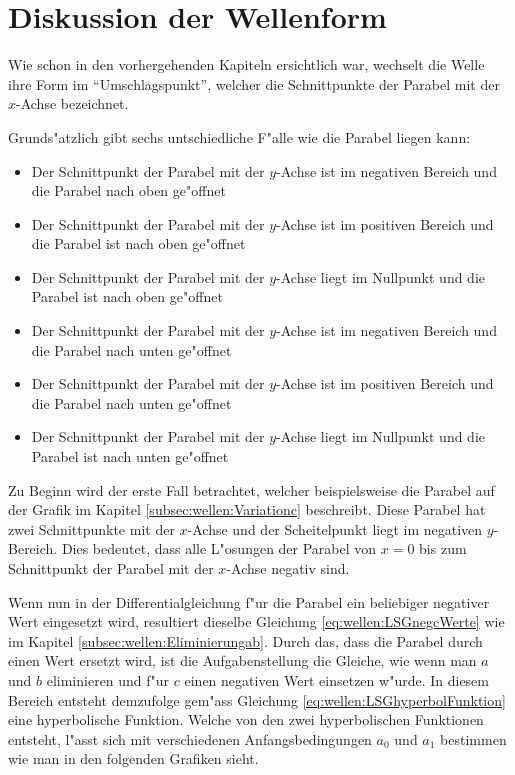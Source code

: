 \section{Diskussion der Wellenform}
\label{sec:wellen:DiskussionWellenform}

Wie schon in den vorhergehenden Kapiteln ersichtlich war, wechselt die Welle 
ihre Form im ``Umschlagspunkt'', welcher die Schnittpunkte der Parabel mit der 
$x$-Achse bezeichnet.


Grunds"atzlich gibt sechs untschiedliche F"alle wie die Parabel liegen kann:
\begin{itemize}
	\item Der Schnittpunkt der Parabel mit der $y$-Achse ist im negativen 
	Bereich und die Parabel nach oben ge"offnet
	\item Der Schnittpunkt der Parabel mit der $y$-Achse ist im positiven 
	Bereich und die Parabel ist nach oben ge"offnet
	\item Der Schnittpunkt der Parabel mit der $y$-Achse liegt im Nullpunkt und 
	die Parabel ist nach oben ge"offnet
	\item Der Schnittpunkt der Parabel mit der $y$-Achse ist im negativen 
	Bereich und die Parabel nach unten ge"offnet
	\item Der Schnittpunkt der Parabel mit der $y$-Achse ist im positiven 
	Bereich und die Parabel nach unten ge"offnet
	\item Der Schnittpunkt der Parabel mit der $y$-Achse liegt im Nullpunkt und 
	die Parabel ist nach unten ge"offnet
\end{itemize}

Zu Beginn wird der erste Fall betrachtet, welcher beispielsweise die Parabel 
auf der Grafik im Kapitel \ref{subsec:wellen:Variationc} beschreibt. Diese 
Parabel hat 
zwei Schnittpunkte mit der $x$-Achse und der Scheitelpunkt liegt im negativen 
$y$-Bereich. Dies bedeutet, dass alle L"osungen der Parabel von $x=0$ bis zum 
Schnittpunkt der Parabel mit der $x$-Achse negativ sind. 

Wenn nun in der Differentialgleichung f"ur die Parabel ein beliebiger negativer 
Wert eingesetzt wird, resultiert dieselbe Gleichung 
\ref{eq:wellen:LSGnegcWerte} 
wie im Kapitel \ref{subsec:wellen:Eliminierungab}. Durch das, dass die Parabel 
durch 
einen Wert ersetzt wird, ist die Aufgabenstellung die Gleiche, wie wenn man $a$ 
und $b$ eliminieren und f"ur $c$ einen negativen Wert einsetzen w"urde. In 
diesem Bereich entsteht demzufolge gem"ass Gleichung 
\ref{eq:wellen:LSGhyperbolFunktion} eine hyperbolische Funktion. Welche von den 
zwei hyperbolischen Funktionen entsteht, l"asst sich mit verschiedenen 
Anfangsbedingungen $a_0$ und $a_1$ bestimmen wie man in den folgenden Grafiken 
sieht.

